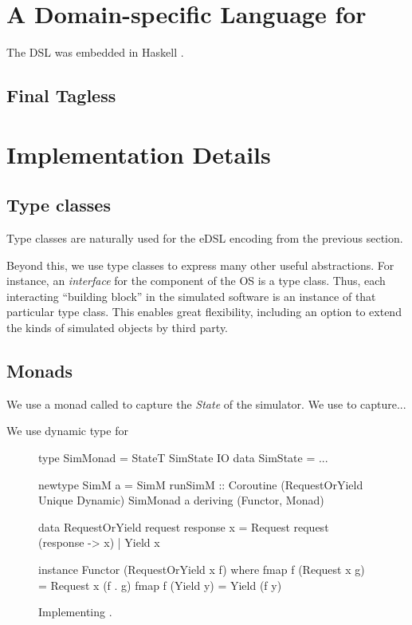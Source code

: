 
\section{A Domain-specific Language for \soosim}
\label{sec:dsl}

The DSL was embedded in Haskell \cite{haskell-report}.

\subsection{Final Tagless}


\section{Implementation Details}
\label{sec:impl-detail}

\subsection{Type classes}

Type classes are naturally used for the eDSL encoding from the
previous section.  

Beyond this, we use type classes to express many
other useful abstractions. For instance, an \emph{interface} for the
component of the OS is a type class. Thus, each interacting ``building
block'' in the simulated software is an instance of that particular
type class. This enables great flexibility, including an option to
extend the kinds of simulated objects by third party.

\subsection{Monads}

We use a monad called  to capture the \emph{State}
 of the simulator. We use
 to capture...

We use dynamic type for 

\begin{figure}
\centering
\begin{code*}
type SimMonad  = StateT SimState IO
data SimState = ...

newtype SimM a 
  = SimM { runSimM :: Coroutine 
      (RequestOrYield Unique Dynamic) 
      SimMonad a }
    deriving (Functor, Monad)

data RequestOrYield request response x
  = Request request (response -> x)
  | Yield   x

instance Functor (RequestOrYield x f) where
  fmap f (Request x g) = Request x (f . g)
  fmap f (Yield y)     = Yield (f y)
\end{code*}
\caption{Implementing .}
\label{fig:code-simm}
\end{figure}

